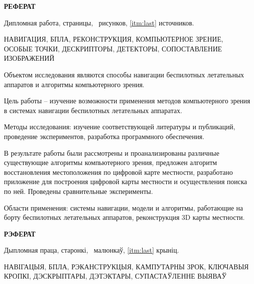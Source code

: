 \begin{center}
  \large\bfseries{РЕФЕРАТ}
\end{center}

Дипломная работа, \pageref{LastPage} страницы, \totalfigures\ рисунков, \ref{itm:last} источников.

\begin{center}
  \large{НАВИГАЦИЯ, БПЛА, РЕКОНСТРУКЦИЯ, КОМПЬЮТЕРНОЕ ЗРЕНИЕ, ОСОБЫЕ ТОЧКИ, ДЕСКРИПТОРЫ, ДЕТЕКТОРЫ, СОПОСТАВЛЕНИЕ ИЗОБРАЖЕНИЙ}
\end{center}

Объектом исследования являются способы навигации беспилотных летательных аппаратов и алгоритмы компьютерного зрения.

\vspace{1em}

Цель работы -- изучение возможности применения методов компьютерного зрения в системах навигации беспилотных летательных аппаратах.

\vspace{1em}

Методы исследования: изучение соответствующей литературы и публикаций, проведение экспериментов, разработка программного обеспечения.

\vspace{1em}

В результате работы были рассмотрены и проанализированы различные существующие алгоритмы компьютерного зрения, предложен алгоритм восстановления местоположения по цифровой карте местности, разработано приложение для построения цифровой карты местности и осуществления поиска по ней. Проведены сравнительные эксперименты.

\vspace{1em}

Области применения: системы навигации, модели и алгоритмы, работающие на борту беспилотных летательных аппаратов, реконструкция 3D карты местности.
\newpage



\begin{center}
     \large\bfseries{РЭФЕРАТ}
\end{center}

Дыпломная праца, \pageref{LastPage} старонкі, \totalfigures\ малюнкаў, \ref{itm:last} крыніц.

\begin{center}
  \large{НАВІГАЦЫЯ, БПЛА, РЭКАНСТРУКЦЫЯ, КАМПУТАРНЫ ЗРОК, КЛЮЧАВЫЯ КРОПКІ, ДЭСКРЫПТАРЫ, ДЭТЭКТАРЫ, СУПАСТАЎЛЕННЕ ВЫЯВАЎ}
\end{center}

